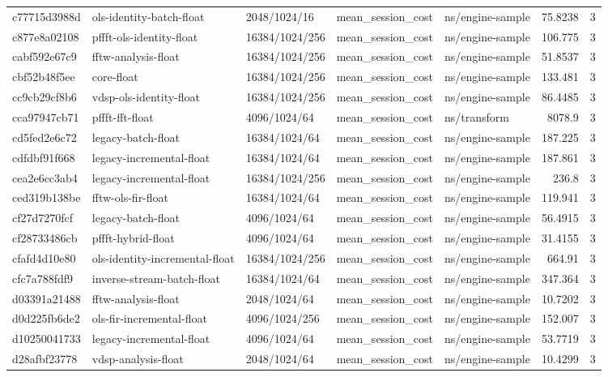 \begin{longtable}{lllllrr}
c77715d3988d & ols-identity-batch-float & 2048/1024/16 & mean\_session\_cost & ns/engine-sample & 75.8238 & 3 \\
c877e8a02108 & pffft-ols-identity-float & 16384/1024/256 & mean\_session\_cost & ns/engine-sample & 106.775 & 3 \\
cabf592e67c9 & fftw-analysis-float & 16384/1024/256 & mean\_session\_cost & ns/engine-sample & 51.8537 & 3 \\
cbf52b48f5ee & core-float & 16384/1024/256 & mean\_session\_cost & ns/engine-sample & 133.481 & 3 \\
cc9cb29cf8b6 & vdsp-ols-identity-float & 16384/1024/256 & mean\_session\_cost & ns/engine-sample & 86.4485 & 3 \\
cca97947cb71 & pffft-fft-float & 4096/1024/64 & mean\_session\_cost & ns/transform & 8078.9 & 3 \\
cd5fed2e6c72 & legacy-batch-float & 16384/1024/64 & mean\_session\_cost & ns/engine-sample & 187.225 & 3 \\
cdfdbf91f668 & legacy-incremental-float & 16384/1024/64 & mean\_session\_cost & ns/engine-sample & 187.861 & 3 \\
cea2e6cc3ab4 & legacy-incremental-float & 16384/1024/256 & mean\_session\_cost & ns/engine-sample & 236.8 & 3 \\
ced319b138be & fftw-ols-fir-float & 16384/1024/64 & mean\_session\_cost & ns/engine-sample & 119.941 & 3 \\
cf27d7270fcf & legacy-batch-float & 4096/1024/64 & mean\_session\_cost & ns/engine-sample & 56.4915 & 3 \\
cf28733486cb & pffft-hybrid-float & 4096/1024/64 & mean\_session\_cost & ns/engine-sample & 31.4155 & 3 \\
cfafd4d10e80 & ols-identity-incremental-float & 16384/1024/256 & mean\_session\_cost & ns/engine-sample & 664.91 & 3 \\
cfc7a788fdf9 & inverse-stream-batch-float & 16384/1024/64 & mean\_session\_cost & ns/engine-sample & 347.364 & 3 \\
d03391a21488 & fftw-analysis-float & 2048/1024/64 & mean\_session\_cost & ns/engine-sample & 10.7202 & 3 \\
d0d225fb6de2 & ols-fir-incremental-float & 4096/1024/256 & mean\_session\_cost & ns/engine-sample & 152.007 & 3 \\
d10250041733 & legacy-incremental-float & 4096/1024/64 & mean\_session\_cost & ns/engine-sample & 53.7719 & 3 \\
d28afbf23778 & vdsp-analysis-float & 2048/1024/64 & mean\_session\_cost & ns/engine-sample & 10.4299 & 3 \\

\end{longtable}
